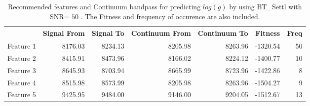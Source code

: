 {{{{\begin{table}
\begin{center}
\begin{tabular}{rrrrrrr}
  \hline
 & Signal From & Signal To & Continuum From & Continuum To & Fitness & Freq \\ 
  \hline
Feature 1 & 8176.03 & 8234.13 & 8205.98 & 8263.96 & -1320.54 &  50 \\ 
  Feature 2 & 8415.91 & 8473.96 & 8166.02 & 8224.12 & -1400.77 &  10 \\ 
  Feature 3 & 8645.93 & 8703.94 & 8665.99 & 8723.96 & -1422.86 &   8 \\ 
  Feature 4 & 8515.98 & 8573.99 & 8205.98 & 8263.96 & -1504.27 &   9 \\ 
  Feature 5 & 9425.95 & 9484.00 & 9146.00 & 9204.05 & -1512.67 &  13 \\ 
   \hline
\end{tabular}
\caption {Recommended features and Continuum bandpass for predicting $log(g)$ 
      by using BT\_Settl with SNR= $ 50 $ . 
      The Fitness and frequency of occurence are also included.} \label{tab:tab_SNR50_G} 
\end{center}
\end{table}

}}}}
